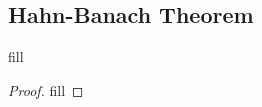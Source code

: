\subsection{Hahn-Banach Theorem}

\begin{exercise}{1}
fill
\end{exercise}
\begin{proof}
fill
\end{proof}